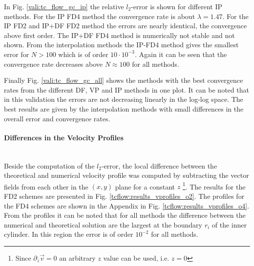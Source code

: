 In Fig. \ref{vali:tc_flow_gc_ip} the relative $l_2$-error is shown for different IP methods.
For the IP FD4 method the convergence rate is about $\lambda=1.47$.
For the IP FD2 and IP+DF FD2 method the errors are nearly  identical, the convergence above first order.
The IP+DF FD4 method is numerically not stable and  not shown.
From the interpolation methods the IP-FD4 method gives the smallest error for $N>100$ which is of order $10 \cdot 10^{-3}$.
Again it can be seen that the convergence rate decreases above $N\approx100$ for all methods.


Finally Fig. \ref{vali:tc_flow_gc_all} shows the methods with the best convergence
rates from the different DF, VP and IP methods in one plot.
It can be noted that in this validation the errors are not decreasing linearly in the log-log space.
The best results are given by the interpolation methods with small differences in the overall error
and convergence rates.

\paragraph{Differences in the Velocity Profiles}\mbox{}\\

Beside the computation of the $l_2$-error, the local difference between the theoretical and numerical velocity
profile was computed by subtracting the vector fields from each other in the $(x, y)$ plane for a constant $z$
\footnote{Since $\partial_z \vec{v} = 0$ an arbitrary $z$ value can be used, i.e. $z=0$}.
The results for the FD2 schemes are presented in Fig. \ref{tcflow:results_vprofiles_o2}. The profiles
for the FD4 schemes are shown in the Appendix in Fig. \ref{tcflow:results_vprofiles_o4}.
From the profiles it can be noted that for all methods the difference between the numerical and
theoretical solution are the largest at the boundary $r_i$ of the  inner cylinder.
In this region the error is of order $10^{-2}$ for all methods.

